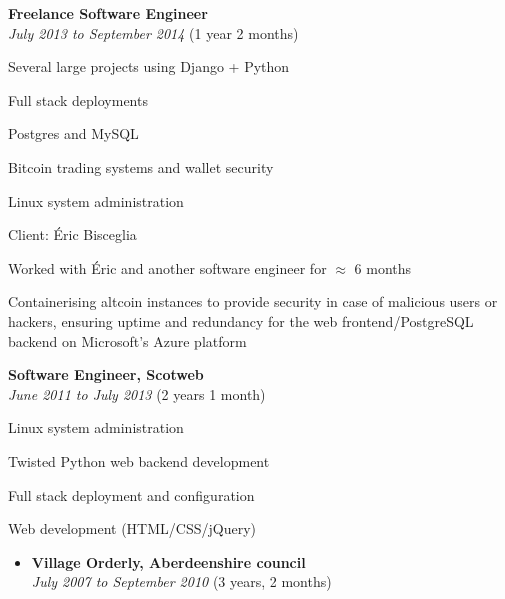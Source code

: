 \documentclass[12pt]{article}
\newenvironment{outerlist}[1][\enskip\textbullet]%
	{\begin{itemize}[#1]}{\end{itemize}%
		\vspace{-.6\baselineskip}}
\newenvironment{innerlist}[1][\enskip\textbullet]%
	{\begin{compactitem}[#1]}{\end{compactitem}}
\newcommand{\halfblankline}{\quad\vspace{-0.5\baselineskip}\pagebreak[3]}
\begin{document}
		\halfblankline
		
		\vspace{-2mm}
		\begin{outerlist}
			\item[] \textbf{Freelance Software Engineer} \\
			\textit{July 2013 to September 2014} (1 year 2 months)
			\begin{innerlist}
				\item Several large projects using Django + Python
				\item Full stack deployments
				\item Postgres and MySQL
				\item Bitcoin trading systems and wallet security
				\item Linux system administration
			\end{innerlist}
			\item[] Client: Éric Bisceglia
			\begin{innerlist}
				\item Worked with Éric and another software engineer for $\approx$ 6 months
				\item Containerising altcoin instances to provide security in case of malicious users or hackers, ensuring uptime and redundancy for the web frontend/PostgreSQL backend on Microsoft's Azure platform
			\end{innerlist}
		\end{outerlist}
		
		\halfblankline
		
		\vspace{-2mm}
		\begin{outerlist}
			\item[] \textbf{Software Engineer, Scotweb} \\
			\textit{June 2011 to July 2013} (2 years 1 month)
			\begin{innerlist}
				\item Linux system administration
				\item Twisted Python web backend development
				\item Full stack deployment and configuration
				\item Web development (HTML/CSS/jQuery)
			\end{innerlist}
		\end{outerlist}
		
		\vspace{-2mm}
		\begin{outerlist}
			\item[] \textbf{Village Orderly, Aberdeenshire council} \\
			\textit{July 2007 to September 2010} (3 years, 2 months)
		\end{outerlist}
		
\end{document}
